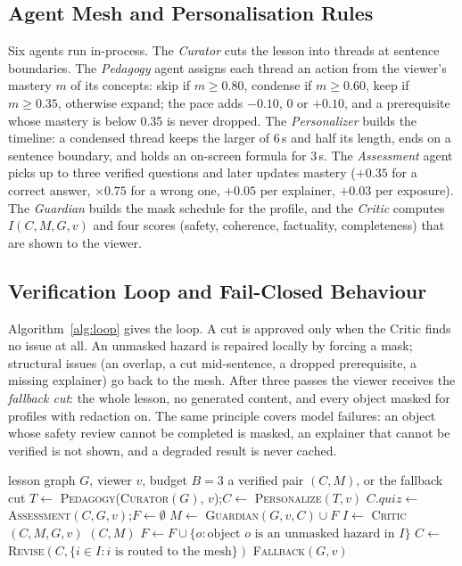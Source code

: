 \documentclass[9pt,a4paper]{extarticle}
\begin{document}
\subsection{Agent Mesh and Personalisation Rules}
Six agents run in-process. The \emph{Curator} cuts the lesson into threads at sentence boundaries. The \emph{Pedagogy}
agent assigns each thread an action from the viewer's mastery $m$ of its concepts: skip if $m\geq0.80$, condense if
$m\geq0.60$, keep if $m\geq0.35$, otherwise expand; the pace adds $-0.10$, $0$ or $+0.10$, and a prerequisite whose
mastery is below 0.35 is never dropped. The \emph{Personalizer} builds the timeline: a condensed thread keeps the larger
of 6\,s and half its length, ends on a sentence boundary, and holds an on-screen formula for 3\,s. The \emph{Assessment}
agent picks up to three verified questions and later updates mastery ($+0.35$ for a correct answer, $\times0.75$ for a
wrong one, $+0.05$ per explainer, $+0.03$ per exposure). The \emph{Guardian} builds the mask schedule for the profile,
and the \emph{Critic} computes $I(C,M,G,v)$ and four scores (safety, coherence, factuality, completeness) that are shown
to the viewer.

\subsection{Verification Loop and Fail-Closed Behaviour}
Algorithm~\ref{alg:loop} gives the loop. A cut is approved only when the Critic finds no issue at all. An unmasked
hazard is repaired locally by forcing a mask; structural issues (an overlap, a cut mid-sentence, a dropped
prerequisite, a missing explainer) go back to the mesh. After three passes the viewer receives the \emph{fallback cut}:
the whole lesson, no generated content, and every object masked for profiles with redaction on. The same principle
covers model failures: an object whose safety review cannot be completed is masked, an explainer that cannot be
verified is not shown, and a degraded result is never cached.

\begin{algorithm}[t]
\caption{Verify-before-deliver loop}
\label{alg:loop}
\begin{algorithmic}[1]
\Require lesson graph $G$, viewer $v$, budget $B=3$
\Ensure a verified pair $(C,M)$, or the fallback cut
\State $T\gets$ \textsc{Pedagogy}(\textsc{Curator}$(G)$, $v$);\quad $C\gets$ \textsc{Personalize}$(T,v)$
\State $C.quiz\gets$ \textsc{Assessment}$(C,G,v)$;\quad $F\gets\emptyset$ 
  \State $M\gets$ \textsc{Guardian}$(G,v,C)\cup F$
  \State $I\gets$ \textsc{Critic}$(C,M,G,v)$
   \Return $(C,M)$ 
  \EndIf
  \State $F\gets F\cup\{o : \text{object } o \text{ is an unmasked hazard in } I\}$
  \State $C\gets$ \textsc{Revise}$(C, \{i\in I: i \text{ is routed to the mesh}\})$
\EndFor
\State \Return \textsc{Fallback}$(G,v)$ 
\end{algorithmic}
\end{algorithm}
\end{document}
